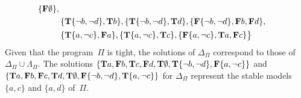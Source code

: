 \begin{Loesung}
{\begin{align*}
  \{\mathbf{F}\emptyset\},
  {} \\ &
  \{\mathbf{T}\{{\neg{b}},{\neg{d}}\},\mathbf{T}b\},
  \{\mathbf{T}\{{\neg{b}},{\neg{d}}\},\mathbf{T}d\},
  \{\mathbf{F}\{{\neg{b}},{\neg{d}}\},\mathbf{F}b,\mathbf{F}d\},
  {} \\ &
  \{\mathbf{T}\{a,{\neg{c}}\},\mathbf{F}a\},
  \{\mathbf{T}\{a,{\neg{c}}\},\mathbf{T}c\},
  \{\mathbf{F}\{a,{\neg{c}}\},\mathbf{T}a,\mathbf{F}c\}
  \big\}
\end{align*}
Given that the program~$\Pi$ is tight, 
the solutions of $\Delta_\Pi$
correspond to those of $\Delta_\Pi\cup\Lambda_\Pi$.
The solutions
$\{\mathbf{T}a,\mathbf{F}b,\mathbf{T}c,\mathbf{F}d,
   \mathbf{T}\emptyset,\mathbf{T}\{{\neg{b}},{\neg{d}}\},\mathbf{F}\{a,{\neg{c}}\}\}$
and\linebreak[4]
$\{\mathbf{T}a,\mathbf{F}b,\mathbf{F}c,\mathbf{T}d,
   \mathbf{T}\emptyset,\mathbf{F}\{{\neg{b}},{\neg{d}}\},\mathbf{T}\{a,{\neg{c}}\}\}$
for $\Delta_\Pi$
represent the stable models $\{a,c\}$ and $\{a,d\}$ of~$\Pi$.
%
}
\end{Loesung}
